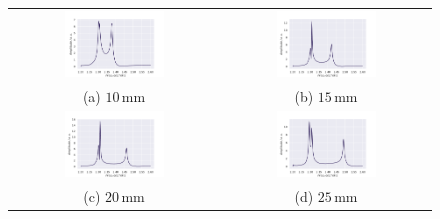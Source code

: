 \begin{figure}[H]
  \centering
  \begin{tabular}{cc}
    \includegraphics[width=0.5\textwidth]{Daten/Wasserstoffmolekuelion/neu/H2_10mm_180.pdf} &   \includegraphics[width=0.5\textwidth]{Daten/Wasserstoffmolekuelion/neu/H2_15mm_180.pdf} \\
  (a) $10 \, \si{\milli\metre}$  & (b) $15 \, \si{\milli\metre}$ \\[6pt]
  \includegraphics[width=0.5\textwidth]{Daten/Wasserstoffmolekuelion/neu/H2_20mm_180.pdf} &   \includegraphics[width=0.5\textwidth]{Daten/Wasserstoffmolekuelion/neu/H2_25mm_180.pdf} \\
  (c)  $20 \, \si{\milli\metre}$ & (d)  $25 \, \si{\milli\metre}$ \\[6pt]

\end{tabular}
\end{figure}
